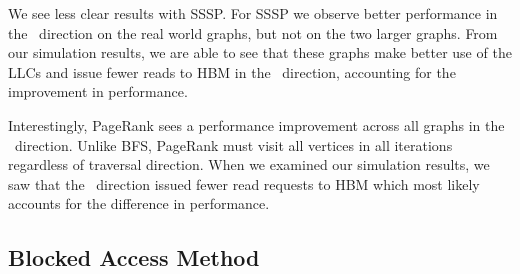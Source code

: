 We see less clear results with SSSP.
For SSSP we observe better performance in the \pull~direction on the real world graphs, but not on the two larger \kron graphs.
From our simulation results, we are able to see that these \kron graphs make better use of the LLCs and issue fewer reads to HBM in the \push~direction, accounting for the improvement in performance. 
 
Interestingly, PageRank sees a performance improvement across all graphs in the \pull~direction.
Unlike BFS, PageRank must visit all vertices in all iterations regardless of traversal direction.
When we examined our simulation results, we saw that the \pull~direction issued fewer read requests to HBM which most likely accounts for the difference in performance. 
 
  
 
\subsection{Blocked Access Method}

